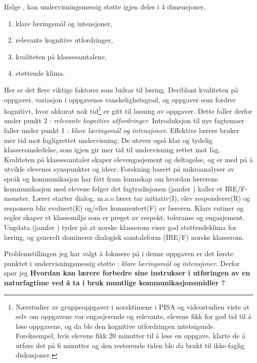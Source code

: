 \documentclass[main.tex]{subfiles}
\begin{document}
Ifølge , kan undervisningsmessig støtte igjen deles i 4 dimensjoner,
\begin{enumerate}
\item klare læringsmål og intensjoner,
\item relevante kognitive utfordringer,
\item kvaliteten på klassesamtalene,
\item støttende klima.
\end{enumerate}
Her er det flere viktige faktorer som bidrar til læring. Deriblant kvaliteten på oppgaver, variasjon i
oppgavenes vanskelighetsgrad, og oppgaver som fordrer kognitivt, hvor akkurat nok tid\footnote{
Nærstudier av gruppeoppgaver i norsktimene i PISA og videostudien  viste at selv om oppgavene
var engasjerende og relevante, elevene fikk for god tid til å løse oppgavene, og da ble den kognitive utfordringen 
intetsigende. Foreksempel, hvis elevene fikk 20 minutter til å løse en oppgave, klarte de å utføre det på 6 
minutter og den resterende tiden ble da brukt til ikke-faglig diskusjoner.} er gitt til løsning av oppgaver. 
Dette faller derfor under punkt 2 : \emph{relevante kognitive utfordringer}. 
Introduksjon til nye fagtemaer faller under punkt 1 : 
\emph{klare læringsmål og intensjoner}. Effektive lærere bruker mer tid mot fagligrettet undervisning. 
De utøver også klar og tydelig klasseromsledelse, som igjen gir mer tid til undervisning rettet mot fag. 
Kvaliteten på klassesamtaler skaper elevengasjement og deltagelse, og er med på å utvikle elevenes synspunkter og ideer. 
Forskning basert på mikroanalyser av språk og kommunikasjon har fått fram kunnskap om hvordan lærerens kommunikasjon
med elevene følger det fagtradisjonen (jamfør ) kaller et IRE/F-mønster. Lærer starter dialog, m.a.o lærer tar 
initiativ(I), elev responderer(R) og responsen blir evaluert(E) og/eller kommentert(F) av læreren.
Klare rutiner og regler skaper et klassemiljø som er preget av respekt, toleranse og engasjement. 
Ungdata (jamfør ) tyder på at norske klasserom viser god støttendeklima for læring, og generelt dominerer 
dialogisk samtaleform (IRE/F) norske klasserom.
\newline

Problemstillingen jeg har valgt å fokusere på i denne oppgaven er det første punktet i undervisningsmessig støtte : 
\emph{klare læringsmål og intensjoner}. Derfor spør jeg 
\newline\newline
\textbf{Hvordan kan lærere forbedre sine instrukser i utføringen av en naturfagtime ved å ta i bruk muntlige kommunikasjonsmidler ?}
\newline
\end{document}
